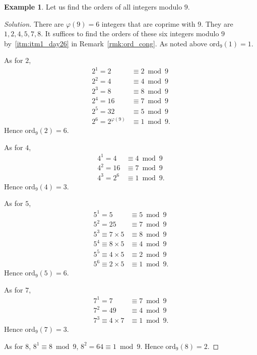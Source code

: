 \documentclass{amsbook}
\theoremstyle{plain}
\theoremstyle{definition}
\newtheorem{example}[theorem]{Example}
\theoremstyle{remark}
\numberwithin{equation}{chapter}
\numberwithin{figure}{chapter}
\newcommand*{\ord}{\text{ord}}
\begin{document}
\begin{example}\label{ex:ex1_day26}
  Let us find the orders of all integers modulo $9$.
\end{example}
\begin{proof}[Solution]
  There are $\varphi (9) = 6$ integers that are coprime with $9$. They are $1, 2, 4, 5, 7, 8$. It suffices to find the orders of these six integers modulo $9$ by~\ref{itm:itm1_day26} in Remark~\ref{rmk:ord_cong}.
  As noted above $\ord_9 (1) = 1$.

  As for $2$, 
\begin{align}
2^1 = 2 &\equiv 2 \bmod 9 \\
2^2 = 4 &\equiv 4 \bmod 9 \\
2^3 = 8 &\equiv 8 \bmod 9 \\
2^4 = 16 &\equiv 7 \bmod 9 \\
2^5 = 32 &\equiv 5 \bmod 9 \\
2^6 = 2^{\varphi (9)} &\equiv 1 \bmod 9.
\end{align}
Hence $\ord_9 (2) = 6$.

  As for $4$, 
\begin{align}
4^1 = 4 &\equiv 4 \bmod 9 \\
4^2 = 16 &\equiv 7 \bmod 9 \\
4^3 = 2^6 &\equiv 1 \bmod 9. 
\end{align}
Hence $\ord_9 (4) = 3$.

  As for $5$, 
\begin{align}
5^1 = 5 &\equiv 5 \bmod 9 \\
5^2 = 25 &\equiv 7 \bmod 9 \\
5^3 \equiv 7 \times 5 &\equiv 8 \bmod 9 \\
5^4 \equiv 8 \times 5 &\equiv 4 \bmod 9 \\
5^5 \equiv 4 \times 5 &\equiv 2 \bmod 9 \\
5^6 \equiv 2 \times 5 &\equiv 1 \bmod 9.
\end{align}
Hence $\ord_9 (5) = 6$.

  As for $7$, 
\begin{align}
7^1 = 7 &\equiv 7 \bmod 9 \\
7^2 = 49 &\equiv 4 \bmod 9 \\
7^3 \equiv 4 \times 7 &\equiv 1 \bmod 9.
\end{align}
Hence $\ord_9 (7) = 3$.

  As for $8$, $8^1  \equiv 8 \bmod 9$, $8^2 = 64 \equiv 1 \bmod 9$. Hence $\ord_9 (8) = 2$.
\end{proof}
\end{document}
